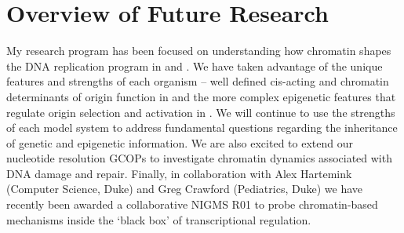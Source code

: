 \section{Overview of Future Research}
My research program has been focused on understanding how chromatin shapes the DNA replication program in \scer and \dros. We have taken advantage of the unique features and strengths of each organism -- well defined cis-acting and chromatin determinants of origin function in \scer and the more complex epigenetic features that regulate origin selection and activation in \dros.  
We will continue to use the strengths of each model system to address fundamental questions regarding the inheritance of genetic and epigenetic information. We are also excited to extend our nucleotide resolution GCOPs to investigate chromatin dynamics associated with DNA damage and repair. Finally, in collaboration with Alex Hartemink (Computer Science, Duke) and Greg Crawford (Pediatrics, Duke) we have recently been awarded a collaborative NIGMS R01 to probe chromatin-based mechanisms inside the `black box' of transcriptional regulation. 

